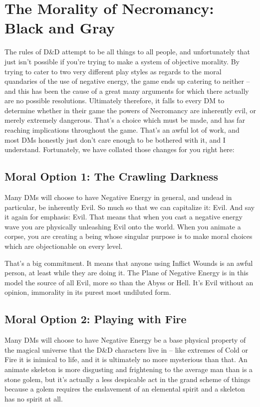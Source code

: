 \chapter{The Morality of Necromancy: Black and Gray}

The rules of D\&D attempt to be all things to all people, and unfortunately that just isn't possible if you're trying to make a system of objective morality. By trying to cater to two very different play styles as regards to the moral quandaries of the use of negative energy, the game ends up catering to neither -- and this has been the cause of a great many arguments for which there actually are no possible resolutions. Ultimately therefore, it falls to every DM to determine whether in their game the powers of Necromancy are inherently evil, or merely extremely dangerous. That's a choice which must be made, and has far reaching implications throughout the game. That's an awful lot of work, and most DMs honestly just don't care enough to be bothered with it, and I understand. Fortunately, we have collated those changes for you right here:

\section{Moral Option 1: The Crawling Darkness}

Many DMs will choose to have Negative Energy in general, and undead in particular, be inherently Evil. So much so that we can capitalize it: Evil. And say it again for emphasis: Evil. That means that when you cast a negative energy wave you are physically unleashing Evil onto the world. When you animate a corpse, you are creating a being whose singular purpose is to make moral choices which are objectionable on every level.

That's a big commitment. It means that anyone using Inflict Wounds is an awful person, at least while they are doing it. The Plane of Negative Energy is in this model the source of all Evil, more so than the Abyss or Hell. It's Evil without an opinion, immorality in its purest most undiluted form.

\section{Moral Option 2: Playing with Fire}

Many DMs will choose to have Negative Energy be a base physical property of the magical universe that the D\&D characters live in -- like extremes of Cold or Fire it is inimical to life, and it is ultimately no more mysterious than that. An animate skeleton is more disgusting and frightening to the average man than is a stone golem, but it's actually a less despicable act in the grand scheme of things because a golem requires the enslavement of an elemental spirit and a skeleton has no spirit at all.


